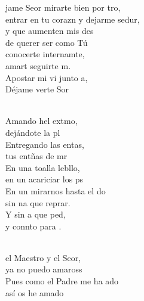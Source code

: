 \documentclass[12pt]{article}
\begin{document}
\begin{multicols*}{2}
        \begin{cancion}%
            jame Seor mirarte bien por tro,\\
            entrar en tu corazn y dejarme sedur,\\
            y que aumenten mis des \\
            de querer ser como Tú\\
            conocerte internamte, \\
            amart seguirte m.\\
            Apostar mi vi junto a,\\
            Déjame verte Sor\\\jump\\
            \begin{chorus}%
            Amando hel extmo, \\
            dejándote la pl\\
            Entregando las entas,  \\
            tus entñas de mr\\
            En una toalla lebllo, \\
            en un acariciar los ps\\
            En un mirarnos hasta el do \\
            sin na que reprar.\\
            Y sin a que ped, \\
            y connto para .\\
            \end{chorus}%
            \jump\\
             el Maestro y el Seor, \\
            ya no puedo amaross \\
            Pues como el Padre me ha ado \\
            así os he amado \\

\end{cancion}
\end{multicols*}
\end{document}
